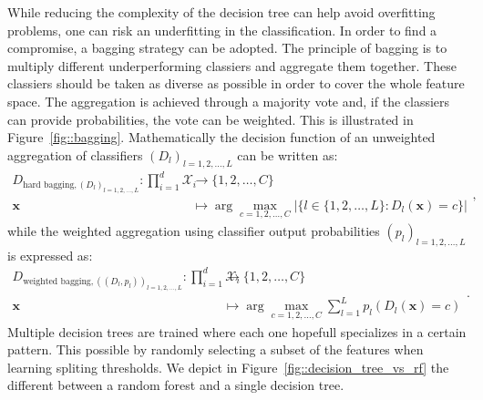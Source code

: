                 While reducing the complexity of the decision tree can help avoid overfitting problems, one can risk an underfitting in the classification.
                In order to find a compromise, a bagging strategy can be adopted.
                The principle of bagging is to multiply different underperforming classiers and aggregate them together.
                These classiers should be taken as diverse as possible in order to cover the whole feature space.
                The aggregation is achieved through a majority vote and, if the classiers can provide probabilities, the vote can be weighted.
                This is illustrated in Figure~\ref{fig::bagging}.
                Mathematically the decision function of an unweighted aggregation of classifiers $\left(D_l\right)_{l=1,2,\dots,L}$ can be written as:
                \begin{equation}
                    \label{eq::decision_function_hard_bagging}
                    \begin{aligned}
                        D_{\text{hard bagging}, \left(D_l\right)_{l=1,2,\dots,L}}: \prod_{i=1}^{d}\mathscr{X}_i &\rightarrow \{1,2,\dots,C\}\\
                        \bm{x} &\mapsto \arg \max_{c=1,2,\dots,C}\lvert\{l\in\{1,2,\dots,L\}: D_l(\bm{x}) = c\}\rvert
                    \end{aligned},
                \end{equation}
                while the weighted aggregation using classifier output probabilities $\left(p_l\right)_{l=1,2,\dots,L}$ is expressed as:
                \begin{equation}
                    \label{eq::decision_function_weighted_bagging}
                    \begin{aligned}
                        D_{\text{weighted bagging}, \left((D_l, p_l)\right)_{l=1,2,\dots,L}}: \prod_{i=1}^{d}\mathscr{X}_i &\rightarrow \{1,2,\dots,C\}\\
                        \bm{x} &\mapsto \arg \max_{c=1,2,\dots,C} \sum_{l=1}^{L} p_l\left(D_l(\bm{x}) = c\right) 
                    \end{aligned}.
                \end{equation}
                Multiple decision trees are trained where each one hopefull specializes in a certain pattern.
                This possible by randomly selecting a subset of the features when learning spliting thresholds.
                We depict in Figure~\ref{fig::decision_tree_vs_rf} the different between a random forest and a single decision tree.
